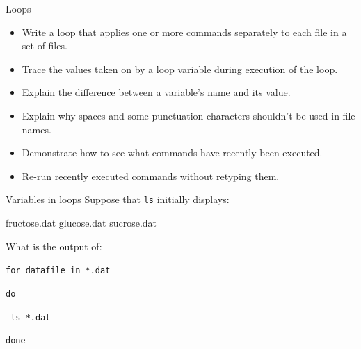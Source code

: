 \documentclass{beamer}
\begin{document}
\begin{frame}{Loops}
\begin{itemize}
    \item{Write a loop that applies one or more commands separately to each file in a set of files.}
    \item{Trace the values taken on by a loop variable during execution of the loop.}
    \item{Explain the difference between a variable's name and its value.}
    \item{Explain why spaces and some punctuation characters shouldn't be used in file names.}
    \item{Demonstrate how to see what commands have recently been executed.}
    \item{Re-run recently executed commands without retyping them.}
    \end{itemize}
\end{frame}



\begin{frame}{Variables in loops}
Suppose that \texttt{ls} initially displays:
\vspace{0.7cm}
\begin{beamerboxesrounded}[upper=uppercolgreen,lower=lowercolgreen,shadow=false]{}
fructose.dat      glucose.dat       sucrose.dat
\end{beamerboxesrounded}

What is the output of:
\vspace{0.7cm}
\begin{beamerboxesrounded}[upper=uppercolgreen,lower=lowercolgreen,shadow=false]{}
\texttt{for datafile in *.dat}

\texttt{do}

\texttt{	ls *.dat}

\texttt{done}
\end{beamerboxesrounded}

\end{frame}

\end{document}
